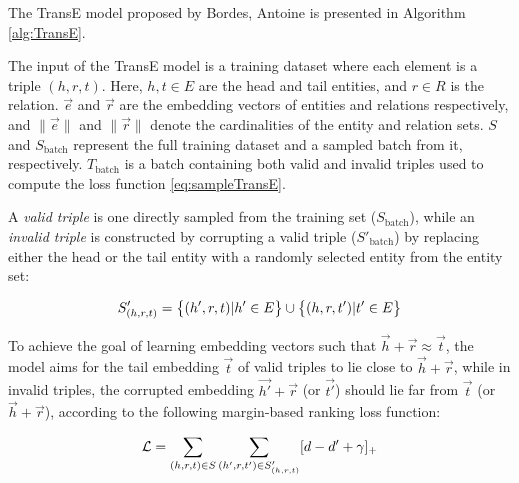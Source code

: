 The TransE model proposed by Bordes, Antoine \cite{bordes2013translating} is presented in Algorithm \ref{alg:TransE}.


The input of the TransE model is a training dataset where each element is a triple $(h, r, t)$. Here, $h, t \in E$ are the head and tail entities, and $r \in R$ is the relation. $\overrightarrow{e}$ and $\overrightarrow{r}$ are the embedding vectors of entities and relations respectively, and $\|\overrightarrow{e}\|$ and $\|\overrightarrow{r}\|$ denote the cardinalities of the entity and relation sets. $S$ and $S_{\text{batch}}$ represent the full training dataset and a sampled batch from it, respectively. $T_{\text{batch}}$ is a batch containing both valid and invalid triples used to compute the loss function \ref{eq:sampleTransE}.

A \textit{valid triple} is one directly sampled from the training set ($S_{\text{batch}}$), while an \textit{invalid triple} is constructed by corrupting a valid triple ($S'_{\text{batch}}$) by replacing either the head or the tail entity with a randomly selected entity from the entity set:

\begin{equation}
	\label{eq:sampleTransE}
	\centering
	S'_{(h, r, t)} = \big\{ (h', r, t) | h' \in E \big\} \cup \big\{ (h, r, t') | t' \in E \big\}
\end{equation}

To achieve the goal of learning embedding vectors such that $\overrightarrow{h} + \overrightarrow{r} \approx \overrightarrow{t}$, the model aims for the tail embedding $\overrightarrow{t}$ of valid triples to lie close to $\overrightarrow{h} + \overrightarrow{r}$, while in invalid triples, the corrupted embedding $\overrightarrow{h'} + \overrightarrow{r}$ (or $\overrightarrow{t'}$) should lie far from $\overrightarrow{t}$ (or $\overrightarrow{h} + \overrightarrow{r}$), according to the following margin-based ranking loss function:

\begin{equation}
	\label{eq:KBGATLoss}
	\centering
	\mathcal{L} = \sum_{(h, r, t) \in S} \sum_{(h', r, t') \in S'_{(h, r, t)}} [d - d' + \gamma]_{+}
\end{equation}


		

